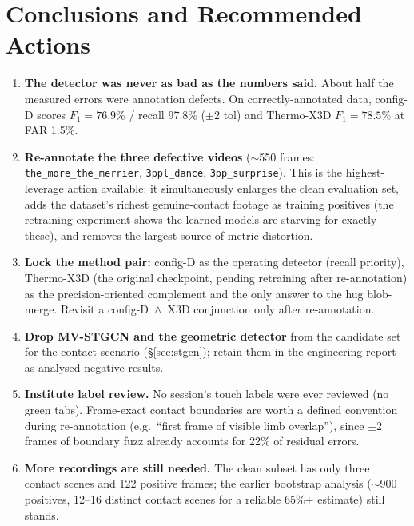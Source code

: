 \documentclass[11pt, a4paper]{article}
\begin{document}
\section{Conclusions and Recommended Actions}

\begin{enumerate}[itemsep=2pt]
    \item \textbf{The detector was never as bad as the numbers said.} About half the
    measured errors were annotation defects. On correctly-annotated data, config-D
    scores $F_1=76.9\%$ / recall 97.8\% ($\pm2$ tol) and Thermo-X3D $F_1=78.5\%$ at
    FAR 1.5\%.
    \item \textbf{Re-annotate the three defective videos} ($\sim$550 frames:
    \texttt{the\_more\_the\_merrier}, \texttt{3ppl\_dance}, \texttt{3pp\_surprise}).
    This is the highest-leverage action available: it simultaneously enlarges the clean
    evaluation set, adds the dataset's richest genuine-contact footage as training
    positives (the retraining experiment shows the learned models are starving for
    exactly these), and removes the largest source of metric distortion.
    \item \textbf{Lock the method pair:} config-D as the operating detector (recall
    priority), Thermo-X3D (the original checkpoint, pending retraining after
    re-annotation) as the precision-oriented complement and the only answer to the hug
    blob-merge. Revisit a config-D~$\wedge$~X3D conjunction only after re-annotation.
    \item \textbf{Drop MV-STGCN and the geometric detector} from the candidate set for
    the contact scenario (\S\ref{sec:stgcn}); retain them in the engineering report as
    analysed negative results.
    \item \textbf{Institute label review.} No session's touch labels were ever reviewed
    (no green tabs). Frame-exact contact boundaries are worth a defined convention
    during re-annotation (e.g.\ ``first frame of visible limb overlap''), since $\pm2$
    frames of boundary fuzz already accounts for 22\% of residual errors.
    \item \textbf{More recordings are still needed.} The clean subset has only three
    contact scenes and 122 positive frames; the earlier bootstrap analysis ($\sim$900
    positives, 12--16 distinct contact scenes for a reliable 65\%+ estimate) still
    stands.
\end{enumerate}
\end{document}
